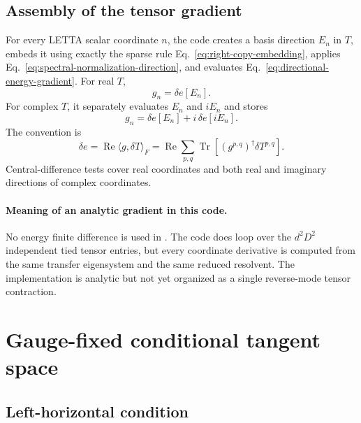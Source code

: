 \documentclass[11pt]{article}
\newcommand{\Tr}{\operatorname{Tr}}
\newcommand{\RePart}{\operatorname{Re}}
\newcommand{\code}[1]{\texttt{\detokenize{#1}}}
\begin{document}
\subsection{Assembly of the tensor gradient}

For every LETTA scalar coordinate $n$, the code creates a basis direction
$E_n$ in $T$, embeds it using exactly the sparse rule
Eq.~\eqref{eq:right-copy-embedding}, applies
Eq.~\eqref{eq:spectral-normalization-direction}, and evaluates
Eq.~\eqref{eq:directional-energy-gradient}.  For real $T$,
\begin{equation}
  g_n=\delta e[E_n].
  \label{eq:real-gradient-coordinate}
\end{equation}
For complex $T$, it separately evaluates $E_n$ and $iE_n$ and stores
\begin{equation}
  g_n=\delta e[E_n]+i\,\delta e[iE_n].
  \label{eq:complex-gradient-coordinate}
\end{equation}
The convention is
\begin{equation}
  \delta e=\RePart\langle g,\delta T\rangle_F
  =\RePart\sum_{p,q}\Tr\!\left[(g^{p,q})^\dagger\delta T^{p,q}\right].
  \label{eq:complex-gradient-convention}
\end{equation}
Central-difference tests cover real coordinates and both real and imaginary
directions of complex coordinates.

\paragraph{Meaning of an analytic gradient in this code.}
No energy finite difference is used in \code{energy_and_gradient}.  The code
does loop over the $d^2D^2$ independent tied tensor entries, but every
coordinate derivative is computed from the same transfer eigensystem and the
same reduced resolvent.  The implementation is analytic but not yet organized
as a single reverse-mode tensor contraction.

\section{Gauge-fixed conditional tangent space}
\label{sec:tangent}

\subsection{Left-horizontal condition}
\end{document}

